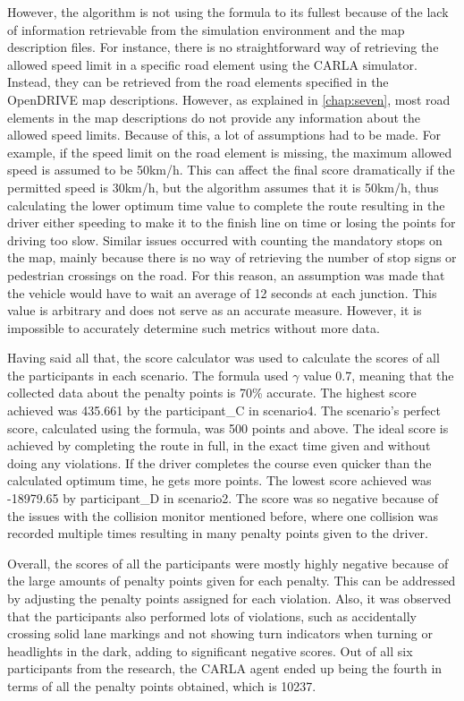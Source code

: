 However, the algorithm is not using the formula to its fullest because of the lack of information retrievable from the simulation environment and the map description files. For instance, there is no straightforward way of retrieving the allowed speed limit in a specific road element using the CARLA simulator. Instead, they can be retrieved from the road elements specified in the OpenDRIVE map descriptions. However, as explained in \autoref{chap:seven}, most road elements in the map descriptions do not provide any information about the allowed speed limits. Because of this, a lot of assumptions had to be made. For example, if the speed limit on the road element is missing, the maximum allowed speed is assumed to be 50km/h. This can affect the final score dramatically if the permitted speed is 30km/h, but the algorithm assumes that it is 50km/h, thus calculating the lower optimum time value to complete the route resulting in the driver either speeding to make it to the finish line on time or losing the points for driving too slow. Similar issues occurred with counting the mandatory stops on the map, mainly because there is no way of retrieving the number of stop signs or pedestrian crossings on the road.
For this reason, an assumption was made that the vehicle would have to wait an average of 12 seconds at each junction. This value is arbitrary and does not serve as an accurate measure. However, it is impossible to accurately determine such metrics without more data.

Having said all that, the score calculator was used to calculate the scores of all the participants in each scenario. The formula used $\gamma$ value 0.7, meaning that the collected data about the penalty points is 70\% accurate. The highest score achieved was 435.661 by the participant\_C in scenario4. The scenario's perfect score, calculated using the formula, was 500 points and above. The ideal score is achieved by completing the route in full, in the exact time given and without doing any violations. If the driver completes the course even quicker than the calculated optimum time, he gets more points. The lowest score achieved was -18979.65 by participant\_D in scenario2. The score was so negative because of the issues with the collision monitor mentioned before, where one collision was recorded multiple times resulting in many penalty points given to the driver.

Overall, the scores of all the participants were mostly highly negative because of the large amounts of penalty points given for each penalty. This can be addressed by adjusting the penalty points assigned for each violation. Also, it was observed that the participants also performed lots of violations, such as accidentally crossing solid lane markings and not showing turn indicators when turning or headlights in the dark, adding to significant negative scores. Out of all six participants from the research, the CARLA agent ended up being the fourth in terms of all the penalty points obtained, which is 10237.
